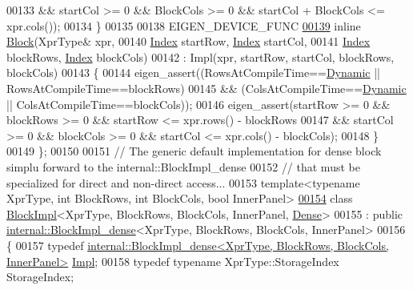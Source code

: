 \begin{DoxyCode}
00133              && startCol >= 0 && BlockCols >= 0 && startCol + BlockCols <= xpr.cols());
00134     \}
00135 
00138     EIGEN\_DEVICE\_FUNC
\hyperlink{group___core___module_a09e495968e1c52a5838bfd102978e09e}{00139}     \textcolor{keyword}{inline} \hyperlink{group___core___module_a09e495968e1c52a5838bfd102978e09e}{Block}(XprType& xpr,
00140           \hyperlink{namespace_eigen_a62e77e0933482dafde8fe197d9a2cfde}{Index} startRow, \hyperlink{namespace_eigen_a62e77e0933482dafde8fe197d9a2cfde}{Index} startCol,
00141           \hyperlink{namespace_eigen_a62e77e0933482dafde8fe197d9a2cfde}{Index} blockRows, \hyperlink{namespace_eigen_a62e77e0933482dafde8fe197d9a2cfde}{Index} blockCols)
00142       : Impl(xpr, startRow, startCol, blockRows, blockCols)
00143     \{
00144       eigen\_assert((RowsAtCompileTime==\hyperlink{namespace_eigen_ad81fa7195215a0ce30017dfac309f0b2}{Dynamic} || RowsAtCompileTime==blockRows)
00145           && (ColsAtCompileTime==\hyperlink{namespace_eigen_ad81fa7195215a0ce30017dfac309f0b2}{Dynamic} || ColsAtCompileTime==blockCols));
00146       eigen\_assert(startRow >= 0 && blockRows >= 0 && startRow  <= xpr.rows() - blockRows
00147           && startCol >= 0 && blockCols >= 0 && startCol <= xpr.cols() - blockCols);
00148     \}
00149 \};
00150          
00151 \textcolor{comment}{// The generic default implementation for dense block simplu forward to the internal::BlockImpl\_dense}
00152 \textcolor{comment}{// that must be specialized for direct and non-direct access...}
00153 \textcolor{keyword}{template}<\textcolor{keyword}{typename} XprType, \textcolor{keywordtype}{int} BlockRows, \textcolor{keywordtype}{int} BlockCols, \textcolor{keywordtype}{bool} InnerPanel>
\hyperlink{class_eigen_1_1_block_impl_3_01_xpr_type_00_01_block_rows_00_01_block_cols_00_01_inner_panel_00_01_dense_01_4}{00154} \textcolor{keyword}{class }\hyperlink{class_eigen_1_1_block_impl}{BlockImpl}<XprType, BlockRows, BlockCols, InnerPanel, \hyperlink{struct_eigen_1_1_dense}{Dense}>
00155   : \textcolor{keyword}{public} \hyperlink{class_eigen_1_1internal_1_1_block_impl__dense}{internal::BlockImpl\_dense}<XprType, BlockRows, BlockCols, InnerPanel>
00156 \{
00157     \textcolor{keyword}{typedef} \hyperlink{class_eigen_1_1internal_1_1_block_impl__dense}{internal::BlockImpl\_dense<XprType, BlockRows, BlockCols, InnerPanel>}
       \hyperlink{class_eigen_1_1internal_1_1_block_impl__dense}{Impl};
00158     \textcolor{keyword}{typedef} \textcolor{keyword}{typename} XprType::StorageIndex StorageIndex;

\end{DoxyCode}
